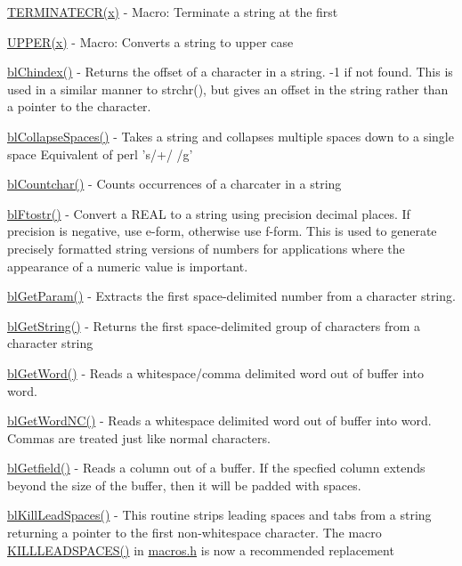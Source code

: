 \begin{DoxyItemize}
\item \hyperlink{macros_8h_acfea63fa7db66757bc17d1dce48f80fb}{T\-E\-R\-M\-I\-N\-A\-T\-E\-C\-R(x)} -\/ Macro\-: Terminate a string at the first 
\item \hyperlink{macros_8h_a8ce7aa85856d9abe74e8f6080cd97740}{U\-P\-P\-E\-R(x)} -\/ Macro\-: Converts a string to upper case
\item \hyperlink{chindex_8c_a2a6525116fbb20bd7232197f58da5cb3}{bl\-Chindex()} -\/ Returns the offset of a character in a string. -\/1 if not found. This is used in a similar manner to strchr(), but gives an offset in the string rather than a pointer to the character.
\item \hyperlink{general_8h_a2f9caac3ea9d130adfb79dc3d8dd44f7}{bl\-Collapse\-Spaces()} -\/ Takes a string and collapses multiple spaces down to a single space Equivalent of perl 's/+/ /g'
\item \hyperlink{countchar_8c_a954ee779da9b59fcbb2065ac61e21c91}{bl\-Countchar()} -\/ Counts occurrences of a charcater in a string
\item \hyperlink{ftostr_8c_adf14ae6edb2230b1198bf3e7bbe87da2}{bl\-Ftostr()} -\/ Convert a R\-E\-A\-L to a string using precision decimal places. If precision is negative, use e-\/form, otherwise use f-\/form. This is used to generate precisely formatted string versions of numbers for applications where the appearance of a numeric value is important.
\item \hyperlink{parse_8c_a8b2804199a5cb9ee4afc116eae9061dc}{bl\-Get\-Param()} -\/ Extracts the first space-\/delimited number from a character string.
\item \hyperlink{parse_8c_af033f70cf7105d7542d8479f74273a5f}{bl\-Get\-String()} -\/ Returns the first space-\/delimited group of characters from a character string
\item \hyperlink{general_8h_ae5bab9f31883eae5ccf5a0a33bda73c2}{bl\-Get\-Word()} -\/ Reads a whitespace/comma delimited word out of buffer into word.
\item \hyperlink{general_8h_a2a5476282817a78d1532407c76a095d1}{bl\-Get\-Word\-N\-C()} -\/ Reads a whitespace delimited word out of buffer into word. Commas are treated just like normal characters.
\item \hyperlink{general_8h_ac8793089a43729df92f62854914dd11a}{bl\-Getfield()} -\/ Reads a column out of a buffer. If the specfied column extends beyond the size of the buffer, then it will be padded with spaces.
\item \hyperlink{general_8h_a343dd1cffc43f451113e38dc681f8868}{bl\-Kill\-Lead\-Spaces()} -\/ This routine strips leading spaces and tabs from a string returning a pointer to the first non-\/whitespace character. The macro \hyperlink{macros_8h_a1b8cbb77f6df1b328324b217ea7eebd3}{K\-I\-L\-L\-L\-E\-A\-D\-S\-P\-A\-C\-E\-S()} in \hyperlink{macros_8h}{macros.\-h} is now a recommended replacement

\end{DoxyItemize}

